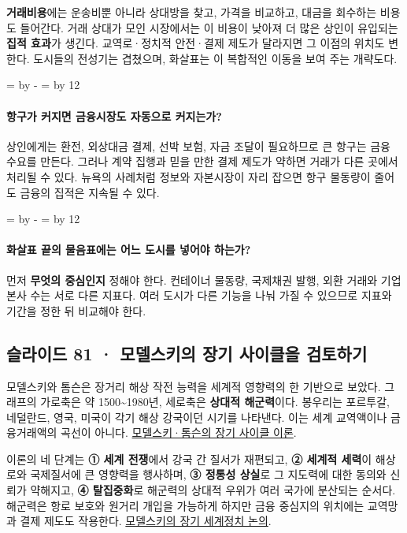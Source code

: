 \documentclass[10pt,a4paper]{article}
\newcommand{\ReserveQuestionSpace}{%
  \par\begingroup
  \dimen0=\pagegoal \advance\dimen0 by -\pagetotal
  \dimen2=\baselineskip \multiply\dimen2 by 12
  \ifdim\dimen0<\dimen2 \newpage\fi
  \endgroup}
\begin{document}
\textbf{거래비용}에는 운송비뿐 아니라 상대방을 찾고, 가격을 비교하고, 대금을 회수하는 비용도 들어간다. 거래 상대가 모인 시장에서는 이 비용이 낮아져 더 많은 상인이 유입되는 \textbf{집적 효과}가 생긴다. 교역로·정치적 안전·결제 제도가 달라지면 그 이점의 위치도 변한다. 도시들의 전성기는 겹쳤으며, 화살표는 이 복합적인 이동을 보여 주는 개략도다.\par

\ReserveQuestionSpace
\paragraph{항구가 커지면 금융시장도 자동으로 커지는가?}
상인에게는 환전, 외상대금 결제, 선박 보험, 자금 조달이 필요하므로 큰 항구는 금융 수요를 만든다. 그러나 계약 집행과 믿을 만한 결제 제도가 약하면 거래가 다른 곳에서 처리될 수 있다. 뉴욕의 사례처럼 정보와 자본시장이 자리 잡으면 항구 물동량이 줄어도 금융의 집적은 지속될 수 있다.\par

\ReserveQuestionSpace
\paragraph{화살표 끝의 물음표에는 어느 도시를 넣어야 하는가?}
먼저 \textbf{무엇의 중심인지} 정해야 한다. 컨테이너 물동량, 국제채권 발행, 외환 거래와 기업 본사 수는 서로 다른 지표다. 여러 도시가 다른 기능을 나눠 가질 수 있으므로 지표와 기간을 정한 뒤 비교해야 한다.\par

\subsection{슬라이드 81 · 모델스키의 장기 사이클을 검토하기}
모델스키와 톰슨은 장거리 해상 작전 능력을 세계적 영향력의 한 기반으로 보았다. 그래프의 가로축은 약 1500\textasciitilde{}1980년, 세로축은 \textbf{상대적 해군력}이다. 봉우리는 포르투갈, 네덜란드, 영국, 미국이 각기 해상 강국이던 시기를 나타낸다. 이는 세계 교역액이나 금융거래액의 곡선이 아니다. \href{https://link.springer.com/chapter/10.1007/978-1-349-09154-6\_5}{모델스키·톰슨의 장기 사이클 이론}.\par

이론의 네 단계는 \textbf{① 세계 전쟁}에서 강국 간 질서가 재편되고, \textbf{② 세계적 세력}이 해상로와 국제질서에 큰 영향력을 행사하며, \textbf{③ 정통성 상실}로 그 지도력에 대한 동의와 신뢰가 약해지고, \textbf{④ 탈집중화}로 해군력의 상대적 우위가 여러 국가에 분산되는 순서다. 해군력은 항로 보호와 원거리 개입을 가능하게 하지만 금융 중심지의 위치에는 교역망과 결제 제도도 작용한다. \href{https://jwsr.pitt.edu/ojs/jwsr/article/view/387}{모델스키의 장기 세계정치 논의}.\par
\end{document}
